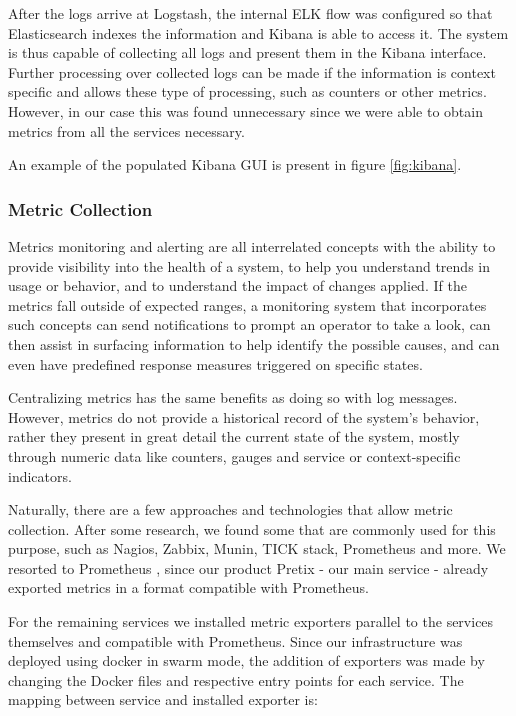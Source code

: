 \documentclass[12pt]{article}
\begin{document}
After the logs arrive at Logstash, the internal ELK flow was configured so that Elasticsearch indexes the information and Kibana is able to access it.
The system is thus capable of collecting all logs and present them in the Kibana interface.
Further processing over collected logs can be made if the information is context specific and allows these type of processing, such as counters or other metrics.
However, in our case this was found unnecessary since we were able to obtain metrics from all the services necessary.

An example of the populated Kibana GUI is present in figure \ref{fig:kibana}.

\subsubsection{Metric Collection}

Metrics monitoring and alerting are all interrelated concepts with the ability to provide visibility into the health of a system, to help you understand trends
in usage or behavior, and to understand the impact of changes applied.
If the metrics fall outside of expected ranges, a monitoring system that incorporates such concepts can send notifications to prompt an operator to take a look,
can then assist in surfacing information to help identify the possible causes, and can even have predefined response measures triggered on specific states.

Centralizing metrics has the same benefits as doing so with log messages.
However, metrics do not provide a historical record of the system's behavior, rather they present in great detail the current state of the system, mostly through
numeric data like counters, gauges and service or context-specific indicators.

Naturally, there are a few approaches and technologies that allow metric collection.
After some research, we found some that are commonly used for this purpose, such as Nagios, Zabbix, Munin, TICK stack, Prometheus and more.
We resorted to Prometheus \cite{prometheus}, since our product Pretix - our main service - already exported metrics in a format compatible with Prometheus.

For the remaining services we installed metric exporters parallel to the services themselves and compatible with Prometheus.
Since our infrastructure was deployed using docker in swarm mode, the addition of exporters was made by changing the Docker files and respective entry points
for each service.
The mapping between service and installed exporter is:
\end{document}
